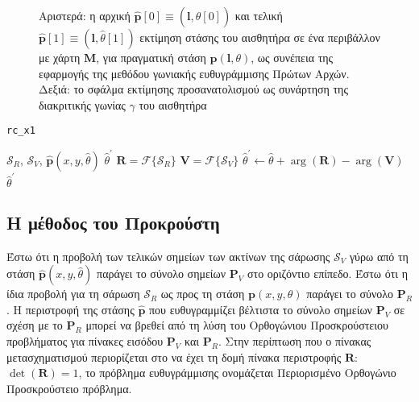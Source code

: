 \begin{figure}[h]\centering
  \vspace{0.5cm}
  
  \vspace{0.5cm}
  \caption{\small Αριστερά: η αρχική
           $\hat{\bm{p}}[0] \equiv (\bm{l},\hat{\theta}[0])$ και τελική
           $\hat{\bm{p}}[1] \equiv (\bm{l},\hat{\theta}[1])$ εκτίμηση στάσης του
           αισθητήρα σε ένα περιβάλλον με χάρτη $\bm{M}$, για πραγματική στάση
           $\bm{p}(\bm{l},\theta)$, ως συνέπεια της εφαρμογής της μεθόδου
           γωνιακής ευθυγράμμισης Πρώτων Αρχών. Δεξιά: το σφάλμα εκτίμησης
           προσανατολισμού ως συνάρτηση της διακριτικής γωνίας $\gamma$ του
           αισθητήρα}
  \label{fig:02_04_02:rc_x1}
\end{figure}

\begin{algorithm}
  \caption{\texttt{rc\_x1}}
  \begin{spacing}{1.3}
  \begin{algorithmic}[1]
    \REQUIRE $\mathcal{S}_R$, $\mathcal{S}_V$, $\hat{\bm{p}}(x, y, \hat{\theta})$
    \ENSURE $\hat{\theta}^\prime$
    \STATE $\bm{R} = \mathcal{F}\{\mathcal{S}_R\}$
    \STATE $\bm{V} = \mathcal{F}\{\mathcal{S}_V\}$
    \STATE $\hat{\theta}^\prime \leftarrow \hat{\theta} + \arg(\bm{R}) - \arg(\bm{V})$
    \RETURN $\hat{\theta}^\prime$
  \end{algorithmic}
  \end{spacing}
  \label{alg:algorithm_x1rc}
\end{algorithm}

\subsection{Η μέθοδος του Προκρούστη}
\label{subsection:02_04_02:03}

Έστω ότι η προβολή των τελικών σημείων των ακτίνων της σάρωσης $\mathcal{S}_V$
γύρω από τη στάση $\hat{\bm{p}}(x,y,\hat{\theta})$ παράγει το σύνολο σημείων
$\bm{P}_V$ στο οριζόντιο επίπεδο. Έστω ότι η ίδια προβολή για τη σάρωση
$\mathcal{S}_R$ ως προς τη στάση $\bm{p}(x,y,\theta)$ παράγει το σύνολο
$\bm{P}_R$. Η περιστροφή της στάσης $\hat{\bm{p}}$ που ευθυγραμμίζει βέλτιστα
το σύνολο σημείων $\bm{P}_V$ σε σχέση με το $\bm{P}_R$ μπορεί να βρεθεί από τη
λύση του Ορθογώνιου Προσκρούστειου προβλήματος \cite{Schonemann1966a} για
πίνακες εισόδου $\bm{P}_V$ και $\bm{P}_R$. Στην περίπτωση που ο πίνακας
μετασχηματισμού περιορίζεται στο να έχει τη δομή πίνακα περιστροφής $\bm{R}$:
$\det{(\bm{R})} = 1$, το πρόβλημα ευθυγράμμισης ονομάζεται Περιορισμένο
Ορθογώνιο Προσκρούστειο πρόβλημα.

